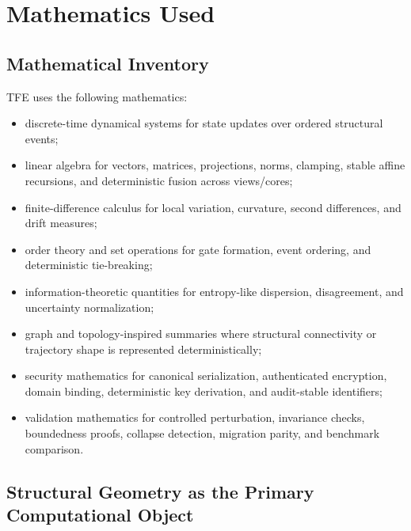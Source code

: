 \chapter{Mathematics Used}
\section{Mathematical Inventory}

TFE uses the following mathematics:
\begin{itemize}
    \item discrete-time dynamical systems for state updates over ordered structural events;
    \item linear algebra for vectors, matrices, projections, norms, clamping, stable affine recursions, and deterministic fusion across views/cores;
    \item finite-difference calculus for local variation, curvature, second differences, and drift measures;
    \item order theory and set operations for gate formation, event ordering, and deterministic tie-breaking;
    \item information-theoretic quantities for entropy-like dispersion, disagreement, and uncertainty normalization;
    \item graph and topology-inspired summaries where structural connectivity or trajectory shape is represented deterministically;
    \item security mathematics for canonical serialization, authenticated encryption, domain binding, deterministic key derivation, and audit-stable identifiers;
    \item validation mathematics for controlled perturbation, invariance checks, boundedness proofs, collapse detection, migration parity, and benchmark comparison.
\end{itemize}


\section{Structural Geometry as the Primary Computational Object}

